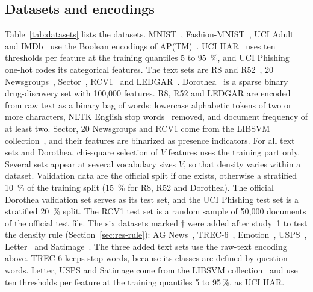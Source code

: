 \documentclass[preprint,12pt,times]{elsarticle}
\newcommand{\hadd}[1]{{\color{harel}#1}}
\begin{document}
\subsection{Datasets and encodings}
Table~\ref{tab:datasets} lists the datasets.
MNIST~\cite{lecun1998mnist}, Fashion-MNIST~\cite{xiao2017fmnist}, UCI Adult~\cite{kohavi1996adult} and IMDb~\cite{maas2011imdb} use the Boolean encodings of AP(TM)~\cite{shrot2026aptm}.
UCI HAR~\cite{anguita2013har} uses ten thresholds per feature at the training quantiles 5 to \SI{95}{\percent}, and UCI Phishing~\cite{mohammad2014phishing} one-hot codes its categorical features.
The text sets are R8 and R52~\cite{cardoso2007r8}, 20 Newsgroups~\cite{lang1995newsweeder}, Sector~\cite{rennie2001sector}, RCV1~\cite{lewis2004rcv1} and LEDGAR~\cite{tuggener2020ledgar,chalkidis2022lexglue}.
Dorothea~\cite{guyon2004dorothea} is a sparse binary drug-discovery set with 100,000 features.
R8, R52 and LEDGAR are encoded from raw text as a binary bag of words: lowercase alphabetic tokens of two or more characters, NLTK English stop words~\cite{bird2009nltk} removed, and document frequency of at least two.
Sector, 20 Newsgroups and RCV1 come from the LIBSVM collection~\cite{chang2011libsvm}, and their features are binarized as presence indicators.
For all text sets and Dorothea, chi-square selection of $V$ features uses the training part only.
Several sets appear at several vocabulary sizes $V$, so that density varies within a dataset.
Validation data are the official split if one exists, otherwise a stratified \SI{10}{\percent} of the training split (\SI{15}{\percent} for R8, R52 and Dorothea).
The official Dorothea validation set serves as its test set, and the UCI Phishing test set is a stratified \SI{20}{\percent} split.
The RCV1 test set is a random sample of 50,000 documents of the official test file.
The six datasets marked $\dagger$ were added after study~1 to test the density rule (Section~\ref{sec:res-rule}): AG News~\cite{zhang2015agnews}, TREC-6~\cite{li2002trec}, Emotion~\cite{saravia2018emotion}, USPS~\cite{hull1994usps}, Letter~\cite{frey1991letter} and Satimage~\cite{michie1994statlog}.
The three added text sets use the raw-text encoding above. TREC-6 keeps stop words, because its classes are defined by question words. \hadd{Letter, USPS and Satimage come from the LIBSVM collection~\cite{chang2011libsvm} and use ten thresholds per feature at the training quantiles 5 to 95\,\%, as UCI HAR.}

\begin{table}[!htbp]
\centering
\caption{Datasets and encodings, ordered by training-set density. Active: mean number of true input bits per sample. $C$: clause budgets per class tested. $\dagger$: added for the out-of-sample density rule.}
\label{tab:datasets}
\footnotesize
\setlength{\tabcolsep}{5pt}

\end{table}
\end{document}
